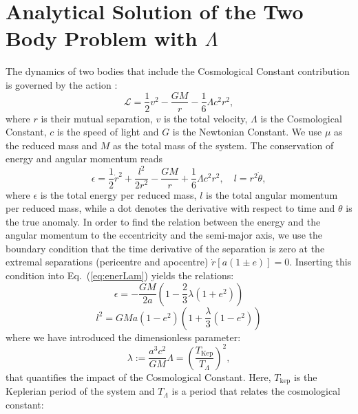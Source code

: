 \section{Analytical Solution of the Two Body Problem with $\Lambda$}
\label{sec:form}

The dynamics of two bodies that include the Cosmological Constant contribution is governed by the action \citep{Carrera:2006im}:
%
\begin{equation}
\mathcal{L} = \frac{1}{2} v^2 - \frac{G M}{r} - \frac{1}{6} \Lambda c^2 r^2, 
\label{eq:Lag}
\end{equation}
%
where $r$ is their mutual separation, $v$ is the total velocity, $\Lambda$ is the Cosmological Constant, $c$ is the speed of light and $G$ is the Newtonian Constant. We use $\mu$ as the reduced mass and $M$ as the total mass of the system. The conservation of energy and  angular momentum reads
%
\begin{equation}
\epsilon = \frac{1}{2}\dot{r}^2 +\frac{l^2}{2 r^2} -\frac{G M}{r} + \frac{1}{6} \Lambda c^2  r^2
,\quad l = r^2 \dot{\theta},
\label{eq:enerLam}
\end{equation}
%
where $\epsilon$ is the total energy per reduced mass, $l$ is the total angular momentum per reduced mass, while a dot denotes the derivative with respect to time and $\theta$ is the true anomaly. In order to find the relation between the energy and the angular momentum to the eccentricity and the semi-major axis, we use the boundary condition that the time derivative of the separation is zero at the extremal separations (pericentre and apocentre) $\dot{r}\left[a\left(1 \pm e\right)\right] = 0$. Inserting this condition into Eq.~(\ref{eq:enerLam}) yields the relations:
%
\begin{equation}
\epsilon = -\frac{G M }{2a} \left(1-\frac{2}{3} \lambda \left(1 + e^2\right) \right)
\end{equation}
%
\begin{equation}
l^2 =  G M a \left(1 - e^2\right) \left(1 + \frac{\lambda}{3}\left( 1 - e^2\right) \right)
\end{equation}
%
where we have introduced the dimensionless parameter:
%
\begin{equation}
\lambda := \frac{a^3 c^2}{G M}\Lambda = \left(\frac{T_{\text{Kep}}}{T_{\Lambda}}\right)^2,
\end{equation}
%
that quantifies the impact of the Cosmological Constant. Here, $T_{\text{kep}}$ is the Keplerian period of the system and $T_{\Lambda}$ is a period that relates the cosmological constant:
